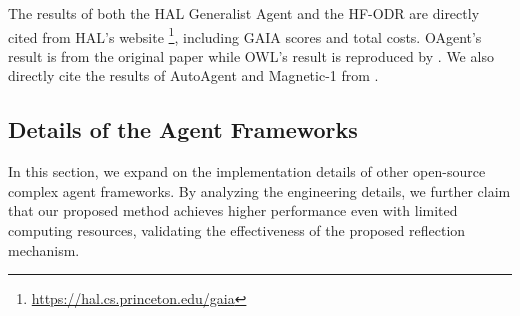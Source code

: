 The results of both the HAL Generalist Agent and the HF-ODR are directly cited from HAL's website \footnote{\url{https://hal.cs.princeton.edu/gaia}}, including GAIA scores and total costs. OAgent's result is from the original paper \citep{zhu2025oagents} while OWL's result is reproduced by \citet{wang2025efficient}. We also directly cite the results of AutoAgent and Magnetic-1 from \citet{chen2023autoagents}.

\subsection{Details of the Agent Frameworks}
In this section, we expand on the implementation details of other open-source complex agent frameworks. By analyzing the engineering details, we further claim that our proposed method achieves higher performance even with limited computing resources, validating the effectiveness of the proposed reflection mechanism.

